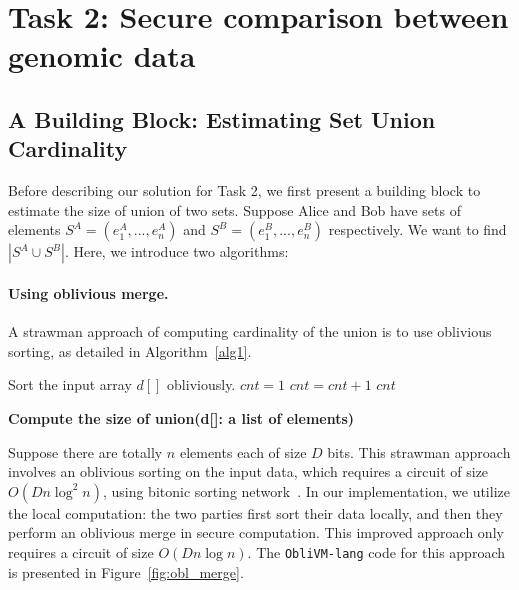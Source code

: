 \section{Task 2: Secure comparison between genomic data}
\subsection{A Building Block: Estimating Set Union Cardinality}
Before describing our solution for Task 2, we first present a building block to estimate the size of union of two sets.
Suppose Alice and Bob have sets of elements $S^A = (e^A_1,...,e^A_n)$
and $S^B = (e^B_1,...,e^B_n)$ respectively. We want to find $|S^A\cup S^B|$. Here, we introduce two algorithms:

\paragraph{Using oblivious merge.}
A strawman approach of computing cardinality of the union is to use oblivious sorting, as detailed in Algorithm~\ref{alg1}.

\begin{algorithm}[t]
\begin{algorithmic}[1]
\State Sort the input array $d[]$ obliviously.
\State $cnt = 1$
		\State $cnt = cnt + 1$
	\EndIf
\EndFor
\State\Return $cnt$
\end{algorithmic}
\caption{\textbf{Compute the size of union(d[]: a list of elements)}} %
\label{alg1}
\end{algorithm}
Suppose there are totally $n$ elements each of size $D$ bits.
This strawman approach involves an oblivious sorting on the input data, which requires a circuit of size $O(Dn\log^2n)$, 
using bitonic sorting network~\cite{bitonicsort}. In our implementation,  we utilize the local computation:
the two parties first sort their data locally, and then they perform an oblivious merge in secure computation. This improved approach
only requires a circuit of size $O(Dn\log n)$. The {\tt ObliVM-lang} code for this approach is presented in Figure~\ref{fig:obl_merge}.

